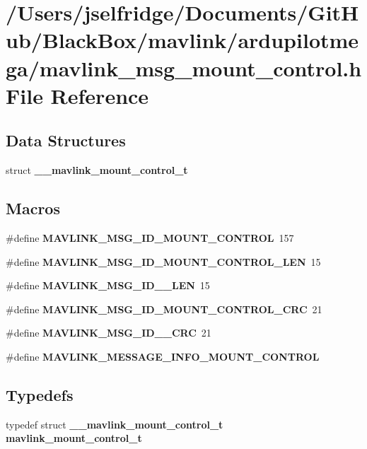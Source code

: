 \section{/\+Users/jselfridge/\+Documents/\+Git\+Hub/\+Black\+Box/mavlink/ardupilotmega/mavlink\+\_\+msg\+\_\+mount\+\_\+control.h File Reference}
\label{mavlink__msg__mount__control_8h}
\subsection*{Data Structures}
\begin{DoxyCompactItemize}
\item 
struct \textbf{ \+\_\+\+\_\+mavlink\+\_\+mount\+\_\+control\+\_\+t}
\end{DoxyCompactItemize}
\subsection*{Macros}
\begin{DoxyCompactItemize}
\item 
\#define \textbf{ M\+A\+V\+L\+I\+N\+K\+\_\+\+M\+S\+G\+\_\+\+I\+D\+\_\+\+M\+O\+U\+N\+T\+\_\+\+C\+O\+N\+T\+R\+OL}~157
\item 
\#define \textbf{ M\+A\+V\+L\+I\+N\+K\+\_\+\+M\+S\+G\+\_\+\+I\+D\+\_\+\+M\+O\+U\+N\+T\+\_\+\+C\+O\+N\+T\+R\+O\+L\+\_\+\+L\+EN}~15
\item 
\#define \textbf{ M\+A\+V\+L\+I\+N\+K\+\_\+\+M\+S\+G\+\_\+\+I\+D\+\_\+\_\+\+L\+EN}~15
\item 
\#define \textbf{ M\+A\+V\+L\+I\+N\+K\+\_\+\+M\+S\+G\+\_\+\+I\+D\+\_\+\+M\+O\+U\+N\+T\+\_\+\+C\+O\+N\+T\+R\+O\+L\+\_\+\+C\+RC}~21
\item 
\#define \textbf{ M\+A\+V\+L\+I\+N\+K\+\_\+\+M\+S\+G\+\_\+\+I\+D\+\_\+\_\+\+C\+RC}~21
\item 
\#define \textbf{ M\+A\+V\+L\+I\+N\+K\+\_\+\+M\+E\+S\+S\+A\+G\+E\+\_\+\+I\+N\+F\+O\+\_\+\+M\+O\+U\+N\+T\+\_\+\+C\+O\+N\+T\+R\+OL}
\end{DoxyCompactItemize}
\subsection*{Typedefs}
\begin{DoxyCompactItemize}
\item 
typedef struct \textbf{ \+\_\+\+\_\+mavlink\+\_\+mount\+\_\+control\+\_\+t} \textbf{ mavlink\+\_\+mount\+\_\+control\+\_\+t}
\end{DoxyCompactItemize}


